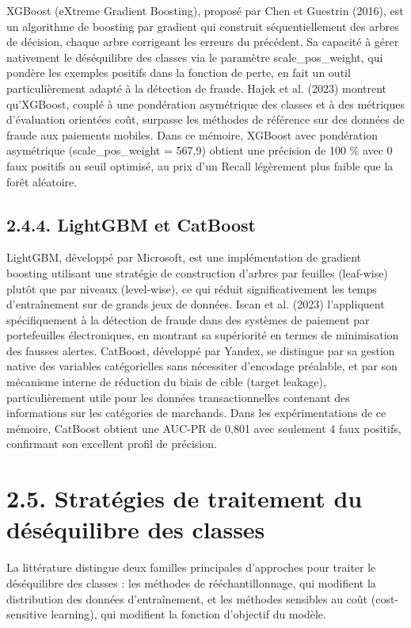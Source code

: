 XGBoost (eXtreme Gradient Boosting), proposé par Chen et Guestrin (2016), est un algorithme de boosting par gradient qui construit séquentiellement des arbres de décision, chaque arbre corrigeant les erreurs du précédent. Sa capacité à gérer nativement le déséquilibre des classes via le paramètre scale\_pos\_weight, qui pondère les exemples positifs dans la fonction de perte, en fait un outil particulièrement adapté à la détection de fraude. Hajek et al. (2023) montrent qu'XGBoost, couplé à une pondération asymétrique des classes et à des métriques d'évaluation orientées coût, surpasse les méthodes de référence sur des données de fraude aux paiements mobiles. Dans ce mémoire, XGBoost avec pondération asymétrique (scale\_pos\_weight = 567,9) obtient une précision de 100 \% avec 0 faux positifs au seuil optimisé, au prix d'un Recall légèrement plus faible que la forêt aléatoire.

\subsection{2.4.4. LightGBM et CatBoost}

LightGBM, développé par Microsoft, est une implémentation de gradient boosting utilisant une stratégie de construction d'arbres par feuilles (leaf-wise) plutôt que par niveaux (level-wise), ce qui réduit significativement les temps d'entraînement sur de grands jeux de données. Iscan et al. (2023) l'appliquent spécifiquement à la détection de fraude dans des systèmes de paiement par portefeuilles électroniques, en montrant sa supériorité en termes de minimisation des fausses alertes. CatBoost, développé par Yandex, se distingue par sa gestion native des variables catégorielles sans nécessiter d'encodage préalable, et par son mécanisme interne de réduction du biais de cible (target leakage), particulièrement utile pour les données transactionnelles contenant des informations sur les catégories de marchands. Dans les expérimentations de ce mémoire, CatBoost obtient une AUC-PR de 0,801 avec seulement 4 faux positifs, confirmant son excellent profil de précision.

\section{2.5. Stratégies de traitement du déséquilibre des classes}

La littérature distingue deux familles principales d'approches pour traiter le déséquilibre des classes : les méthodes de rééchantillonnage, qui modifient la distribution des données d'entraînement, et les méthodes sensibles au coût (cost-sensitive learning), qui modifient la fonction d'objectif du modèle.

